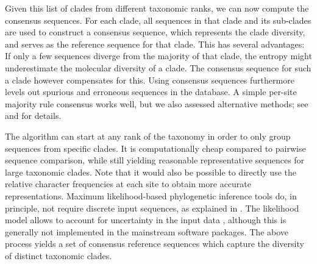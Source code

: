 

Given this list of clades from different taxonomic ranks, we can now compute the consensus sequences.
For each clade, all sequences in that clade and its sub-clades are used to construct a consensus sequence,
which represents the clade diversity, and serves as the reference sequence for that clade.
This has several advantages:
If only a few sequences diverge from the majority of that clade,
the entropy might underestimate the molecular diversity of a clade.
The consensus sequence for such a clade however compensates for this.
Using consensus sequences furthermore levels out spurious and erroneous sequences in the database.
A simple per-site majority rule consensus \cite{May1952,Day1992a} works well,
but we also assessed alternative methods;
see  and  for details.

The algorithm can start at any rank of the taxonomy in order to only group sequences from specific clades.
It is computationally cheap compared to pairwise sequence comparison,
while still yielding reasonable representative sequences for large taxonomic clades.
Note that it would also be possible to directly use the relative character frequencies at each site
to obtain more accurate representations.
Maximum likelihood-based phylogenetic inference tools do, in principle, not require discrete input sequences,
as explained in .
The likelihood model allows to account for uncertainty in the input data \cite{Felsenstein2004},
although this is generally not implemented in the mainstream software packages.
The above process yields a set of consensus reference sequences which capture the diversity of distinct taxonomic clades.

